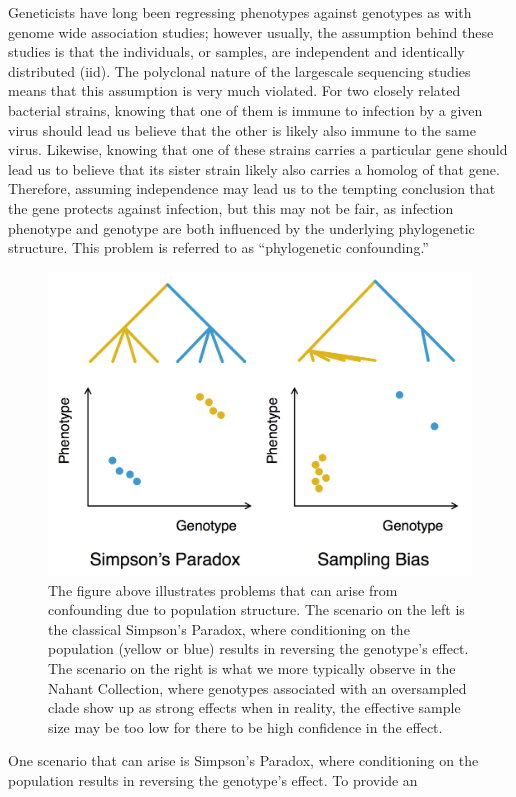 \documentclass[12pt,twoside]{mitthesis-manusdown}
\begin{document}
Geneticists have long been regressing phenotypes against genotypes as
with genome wide association studies; however usually, the assumption
behind these studies is that the individuals, or samples, are
independent and identically distributed (iid). The polyclonal nature of
the largescale sequencing studies means that this assumption is very
much violated. For two closely related bacterial strains, knowing that
one of them is immune to infection by a given virus should lead us
believe that the other is likely also immune to the same virus.
Likewise, knowing that one of these strains carries a particular gene
should lead us to believe that its sister strain likely also carries a
homolog of that gene. Therefore, assuming independence may lead us to
the tempting conclusion that the gene protects against infection, but
this may not be fair, as infection phenotype and genotype are both
influenced by the underlying phylogenetic structure. This problem is
referred to as ``phylogenetic confounding.''
\begin{figure}[tb!]

{\centering \includegraphics[width=0.6\linewidth]{figuresintro/phylfig} 

}

\caption{\label{fig:phylfig}The figure above illustrates problems that can arise from confounding due to population structure. The scenario on the left is the classical Simpson's Paradox, where conditioning on the population (yellow or blue) results in reversing the genotype's effect. The scenario on the right is what we more typically observe in the Nahant Collection, where genotypes associated with an oversampled clade show up as strong effects when in reality, the effective sample size may be too low for there to be high confidence in the effect.}\label{fig:phylfig}
\end{figure}
One scenario that can arise is Simpson's Paradox, where conditioning on
the population results in reversing the genotype's effect. To provide an
\end{document}
